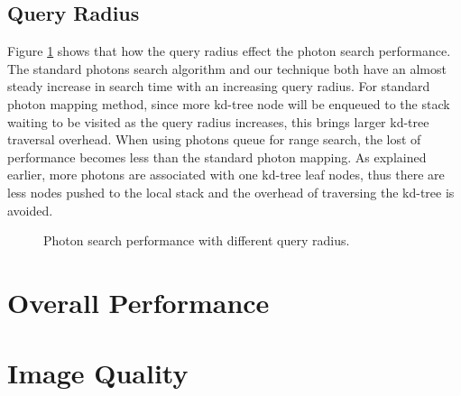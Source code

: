 \subsection{Query Radius}

Figure \ref{fig:photon_search_2} shows that how the query radius effect the photon search performance. The standard photons search algorithm and our technique both have an almost steady increase in search time with an increasing query radius. For standard photon mapping method, since more kd-tree node will be enqueued to the stack waiting to be visited as the query radius increases, this brings larger kd-tree traversal overhead. When using photons queue for range search, the lost of performance becomes less than the standard photon mapping. As explained earlier, more photons are associated with one kd-tree leaf nodes, thus there are less nodes pushed to the local stack and the overhead of traversing the kd-tree is avoided. 

\begin{figure}[ftp] 
    \centering 
    \renewcommand{\thefigure}{\thechapter.\arabic{figure}}
    \caption[]{Photon search performance with different query radius. }
    \label{fig:photon_search_2}  
\end{figure} 


\section{Overall Performance} 


\section{Image Quality}

